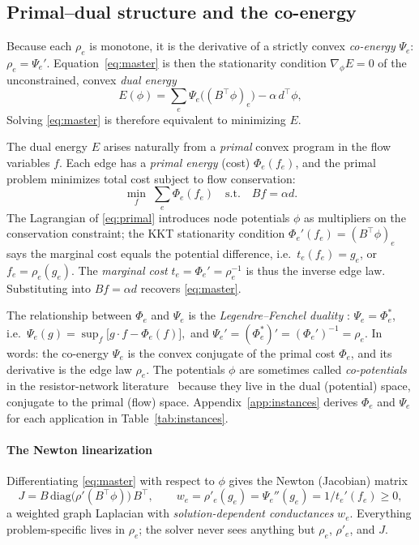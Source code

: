 \documentclass{siamart220329}
\begin{document}
\subsection{Primal--dual structure and the co-energy}
Because each $\rho_e$ is monotone, it is the derivative of a strictly convex \emph{co-energy}
$\Psi_e$: $\rho_e=\Psi_e'$. Equation~\eqref{eq:master} is then the stationarity condition
$\nabla_\phi E=0$ of the unconstrained, convex \emph{dual energy}
\begin{equation}\label{eq:dual}
  E(\phi)=\sum_e\Psi_e\!\big((B^{\top}\phi)_e\big)-\alpha\,d^{\top}\phi,
\end{equation}
Solving \eqref{eq:master} is therefore equivalent to
minimizing $E$.

The dual energy $E$ arises naturally from a \emph{primal} convex program in the flow variables $f$.
Each edge has a \emph{primal energy} (cost) $\Phi_e(f_e)$, and the primal problem minimizes total
cost subject to flow conservation:
\begin{equation}\label{eq:primal}
  \min_f\;\sum_e\Phi_e(f_e)\quad\text{s.t.}\quad Bf=\alpha d .
\end{equation}
The Lagrangian of \eqref{eq:primal} introduces node potentials $\phi$ as multipliers on the
conservation constraint; the KKT stationarity condition $\Phi_e'(f_e)=(B^{\top}\phi)_e$ says the
marginal cost equals the potential difference, i.e.\ $t_e(f_e)=g_e$, or $f_e=\rho_e(g_e)$.
The \emph{marginal cost} $t_e=\Phi_e'=\rho_e^{-1}$ is thus the inverse edge law.
Substituting into $Bf=\alpha d$ recovers \eqref{eq:master}.

The relationship between $\Phi_e$ and $\Psi_e$ is the \emph{Legendre--Fenchel duality}
\cite{boyd-vandenberghe}: $\Psi_e=\Phi_e^*$, i.e.\
$\Psi_e(g)=\sup_f\bigl[g\cdot f-\Phi_e(f)\bigr],$
and $\Psi_e'=(\Phi_e^*)'=(\Phi_e')^{-1}=\rho_e$. In words: the co-energy $\Psi_e$ is the convex
conjugate of the primal cost $\Phi_e$, and its derivative is the edge law $\rho_e$. The
potentials $\phi$ are sometimes called \emph{co-potentials} in the resistor-network
literature~\cite{doyle-snell} because they live in the dual (potential) space, conjugate to the
primal (flow) space. Appendix~\ref{app:instances} derives $\Phi_e$ and $\Psi_e$ for each
application in Table~\ref{tab:instances}.

\paragraph{The Newton linearization}
Differentiating \eqref{eq:master} with respect to $\phi$ gives the Newton (Jacobian) matrix
\begin{equation}\label{eq:jac}
  J=B\,\mathrm{diag}\!\bigl(\rho'(B^{\top}\phi)\bigr)\,B^{\top},\qquad
  w_e=\rho'_e(g_e)=\Psi_e''(g_e)=1/t_e'(f_e)\ge0 ,
\end{equation}
a weighted graph Laplacian with \emph{solution-dependent conductances} $w_e$. Everything
problem-specific lives in $\rho_e$; the solver never sees anything but $\rho_e$, $\rho'_e$,
and $J$.
\end{document}
